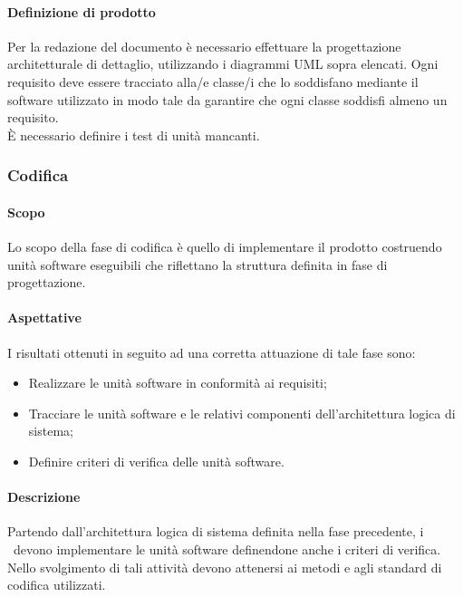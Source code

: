 \documentclass[../NormeDiProgetto.tex]{subfiles}
\begin{document}
			\paragraph{Definizione di prodotto\\}
				Per la redazione del documento è necessario effettuare la progettazione architetturale di
				dettaglio, utilizzando i diagrammi UML sopra elencati. Ogni requisito deve essere tracciato
				alla/e classe/i che lo soddisfano mediante il software utilizzato in modo tale da garantire
				che ogni classe soddisfi almeno un requisito.\\
				È necessario definire i test di unità mancanti.
		\subsubsection{Codifica}
			\paragraph{Scopo\\}
				Lo scopo della fase di codifica è quello di implementare il prodotto costruendo
				unità software eseguibili che riflettano la struttura definita in fase di
				progettazione.
			\paragraph{Aspettative\\}
				I risultati ottenuti in seguito ad una corretta attuazione di tale fase sono:
				\begin{itemize}
					\item Realizzare le unità software in conformità ai requisiti;
					\item Tracciare le unità software e le relativi componenti dell'architettura
					logica di sistema;
					\item Definire criteri di verifica delle unità software.
				\end{itemize}
			\paragraph{Descrizione\\}
				Partendo dall'architettura logica di sistema definita nella fase precedente, i
				\programmatori\ devono implementare le unità software definendone anche i criteri di
				verifica. Nello svolgimento di tali attività devono attenersi ai metodi e
				agli standard di codifica utilizzati.
\end{document}
